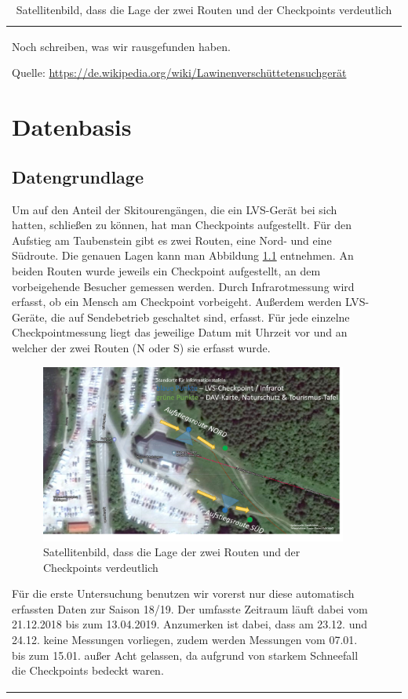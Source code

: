 \documentclass[11pt,a4paper]{report}
\begin{document}
\begin{table}
\begin{tabular}{p{3cm}|p{5cm}|p{4cm}}
\begin{document}
	Noch schreiben, was wir rausgefunden haben.
	
	Quelle:
	\url{https://de.wikipedia.org/wiki/Lawinenverschüttetensuchgerät}
	
	\chapter{Datenbasis}
	\section{Datengrundlage}
	Um auf den Anteil der Skitourengängen, die ein LVS-Gerät bei sich hatten, schließen zu können, hat man Checkpoints aufgestellt. Für den Aufstieg am Taubenstein gibt es zwei Routen, eine Nord- und eine Südroute. Die genauen Lagen kann man Abbildung \ref{pic:checkpoints} entnehmen. An beiden Routen wurde jeweils ein Checkpoint aufgestellt, an dem vorbeigehende Besucher gemessen werden. Durch Infrarotmessung wird erfasst, ob ein Mensch am Checkpoint vorbeigeht. Außerdem werden LVS-Geräte, die auf Sendebetrieb geschaltet sind, erfasst. Für jede einzelne Checkpointmessung liegt das jeweilige Datum mit Uhrzeit vor und an welcher der zwei Routen (N oder S) sie erfasst wurde.
	
	\begin{figure}[H]
		\centering
		\includegraphics[width=.9\textwidth]{bilder/checkpoints}
		\caption{Satellitenbild, dass die Lage der zwei Routen und der Checkpoints verdeutlich}
		\label{pic:checkpoints}
	\end{figure}
	
	\noindent Für die erste Untersuchung benutzen wir vorerst nur diese automatisch erfassten Daten zur Saison 18/19. Der umfasste Zeitraum läuft dabei vom 21.12.2018 bis zum 13.04.2019. Anzumerken ist dabei, dass am 23.12. und 24.12. keine Messungen vorliegen, zudem werden Messungen vom 07.01. bis zum 15.01. außer Acht gelassen, da aufgrund von starkem Schneefall die Checkpoints bedeckt waren.
	

\end{document}
\end{tabular}
\end{table}
\end{document}
